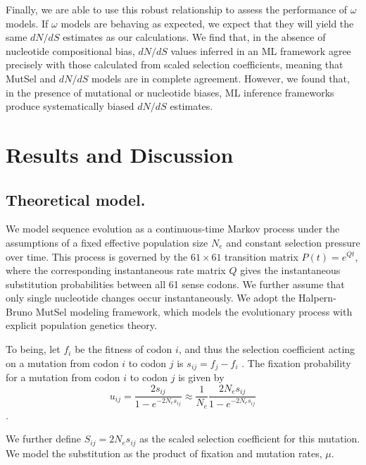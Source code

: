 \documentclass{pnastwo}
\begin{document}
\begin{article}
Finally, we are able to use this robust relationship to assess the performance of $\omega$ models. If $\omega$ models are behaving as expected, we expect that they will yield the same $dN/dS$ estimates as our calculations. We find that, in the absence of nucleotide compositional bias, $dN/dS$ values inferred in an ML framework agree precisely with those calculated from scaled selection coefficients, meaning that MutSel and $dN/dS$ models are in complete agreement. However, we found that, in the presence of mutational or nucleotide biases, ML inference frameworks produce systematically biased $dN/dS$ estimates. 
		
		
\section*{Results and Discussion}
		
		
\subsection*{Theoretical model.}

We model sequence evolution as a continuous-time Markov process \cite{Yang2006} under the assumptions of a fixed effective population size $N_e$ and constant selection pressure over time. This process is governed by the $61 \times 61$ transition matrix $P(t) = e^{Qt}$, where the corresponding instantaneous rate matrix $Q$ gives the instantaneous substitution probabilities between all 61 sense codons. We further assume that only single nucleotide changes occur instantaneously. We adopt the Halpern-Bruno \cite{HalpernBruno1998,YangNielsen2008,Tamurietal2012,Thorne2012} MutSel modeling framework, which models the evolutionary process with explicit population genetics theory. 

To being, let $f_i$ be the fitness of codon $i$, and thus the selection coefficient acting on a mutation from codon $i$ to codon $j$ is $s_{ij} = f_j - f_i$ \cite{SellaHirsh2005,YangNielsen2008}. The fixation probability for a mutation from codon $i$ to codon $j$ is given by 
\begin{equation}\label{eq:u_ij}
u_{ij} = \frac{2s_{ij}}{1 - e^{-2N_es_{ij}}} \approx \frac{1}{N_e}\frac{2N_es_{ij}}{1 - e^{-2N_es_{ij}}}
\end{equation} \cite{Kimura1962,HalpernBruno1998,YangNielsen2008}. 

We further define $S_{ij} = 2N_es_{ij}$ as the scaled selection coefficient for this mutation. We model the substitution as the product of fixation and mutation rates, $\mu$. 


\end{article}
\end{document}
